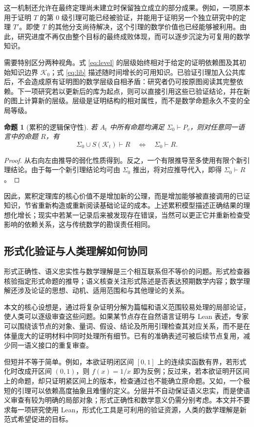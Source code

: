 \documentclass[UTF8,11pt,a4paper,fontset=fandol]{ctexart}
\newtheorem{proposition}{命题}
\theoremstyle{definition}\newtheorem{definition}{定义}
\newcommand{\K}{\mathcal K}
\begin{document}
这一机制还允许在最终定理尚未建立时保留独立成立的部分成果。例如，一项原本用于证明 $T$ 的第 0 级引理可能已经被验证，并能用于证明另一个独立研究中的定理 $T'$。即使 $T$ 的其他分支尚待解决，这个引理的数学价值也已经能够被利用。由此，研究进度不再仅由整个目标的最终成败体现，而可以逐步沉淀为可复用的数学知识。

需要特别区分两种视角。式 \eqref{eq:level} 的层级始终相对于给定的证明依赖图及其初始知识边界 $\K_0$；式 \eqref{eq:lib} 描述随时间增长的可用知识。已验证引理加入公共库后，不会造成原有证明图的数学层级自相矛盾：研究者仍可按原图阅读其完整依赖。下一项研究若以更新后的库为起点，则可以直接引用这些已验证结论，并在新的图上计算新的层级。层级是证明结构的相对属性，而不是数学命题永久不变的全局等级。

\begin{proposition}[累积的逻辑保守性]\label{prop:conservative}
若 $A_t$ 中所有命题均满足 $\Sigma_0\vdash P_v$，则对任意同一语言中的命题 $R$，有
\[
 \Sigma_0\cup S(\K_t)\vdash R\quad\Longleftrightarrow\quad\Sigma_0\vdash R.
\]
\end{proposition}
\begin{proof}
从右向左由推导的弱化性质得到。反之，一个有限推导至多使用有限个新引理结论。由于每一个新引理结论均可由 $\Sigma_0$ 推出，将对应推导代入，即得 $\Sigma_0\vdash R$。
\end{proof}

因此，累积定理库的核心价值不是增加新的公理，而是增加能够被直接调用的已证知识，节省重新构造或重新阅读基础论证的成本。上述累积模型描述正确结果的理想化增长；现实中若某一记录后来被发现存在错误，当然可以更正它并重新检查受影响的依赖关系，这与传统数学的勘误责任相同。

\subsection{形式化验证与人类理解如何协同}
形式正确性、语义忠实性与数学理解是三个相互联系但不等价的问题。形式检查器核验指定形式命题的推导；语义核查关注形式陈述是否表达预期数学内容；数学理解还涉及论证的思想、动机、适用范围和与其他理论的关系。

本文的核心设想是，通过将复杂证明分解为篇幅和语义范围较易处理的局部论证，使人类可以逐级审查这些问题。如果某节点存在自然语言证明与 Lean 表述，专家可以围绕该节点的对象、量词、假设、结论及所用引理检查其对应关系，而不是在体量庞大的证明材料中同时处理所有细节。已有的准确表述可被后续节点复用，减少同一语义接口的重复审查。

但短并不等于简单。例如，本欲证明闭区间 $[0,1]$ 上的连续实函数有界，若形式化时改成开区间 $(0,1)$，则 $f(x)=1/x$ 即为反例；反过来，若本欲证明开区间上的命题，却只证明紧区间上的版本，检查通过也不能确立原命题。又如，一个极短的引理可以依赖高度抽象且难懂的定义。分层并不自动保证语义忠实，而是使语义审查有较为明确的局部对象；形式正确性和数学意义仍需分别考虑。本文并不要求每一项研究使用 Lean，形式化工具是可利用的验证资源，人类的数学理解是新范式希望促进的目标。
\end{document}
